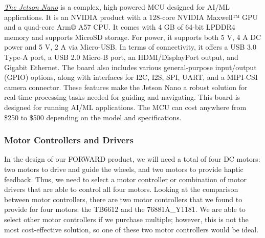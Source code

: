 \noindent \underline{\textit{The Jetson Nano}} is a complex, high powered MCU designed for AI/ML applications. It is an NVIDIA product with a 128-core NVIDIA Maxwell™ GPU and a quad-core Arm® A57 CPU. It comes with 4 GB of 64-bit LPDDR4 memory and supports MicroSD storage. For power, it supports both 5 V, 4 A DC power and 5 V, 2 A via Micro-USB. In terms of connectivity, it offers a USB 3.0 Type-A port, a USB 2.0 Micro-B port, an HDMI/DisplayPort output, and Gigabit Ethernet. The board also includes various general-purpose input/output (GPIO) options, along with interfaces for I2C, I2S, SPI, UART, and a MIPI-CSI camera connector. These features make the Jetson Nano a robust solution for real-time processing tasks needed for guiding and navigating. This board is designed for running AI/ML applications. The MCU can cost anywhere from \$250 to \$500 depending on the model and specifications. \\

\subsubsection{Motor Controllers and Drivers}
\noindent In the design of our FORWARD product, we will need a total of four DC motors: two motors to drive and guide the wheels, and two motors to provide haptic feedback. Thus, we need to select a motor controller or combination of motor drivers that are able to control all four motors. Looking at the comparison between motor controllers, there are two motor controllers that we found to provide for four motors: the TB6612 and the 76881A\_Y1181. We are able to select other motor controllers if we purchase multiple; however, this is not the most cost-effective solution, so one of these two motor controllers would be ideal. \\

